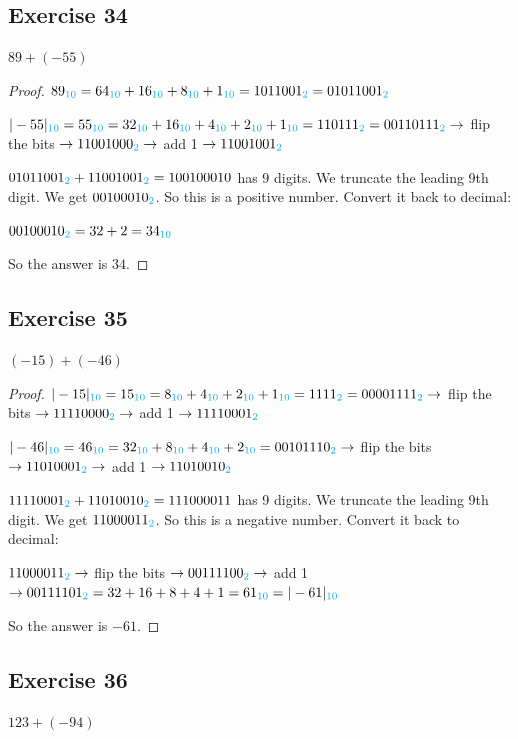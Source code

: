 \documentclass[14pt]{extarticle}
\newcommand{\base}[1]{{\color{cyan}#1}}
\begin{document}
\subsection{Exercise 34}
$89 + (-55)$

\begin{proof}
$89_\base{10} = 64_\base{10} + 16_\base{10} + 8_\base{10} +
1_\base{10} = 1011001_\base{2} = 01011001_\base{2}$

$|-55|_\base{10} = 55_\base{10} = 32_\base{10} + 16_\base{10} + 4_\base{10} + 2_\base{10} + 1_\base{10} = 110111_\base{2} = 00110111_\base{2} \to$ flip the bits $\to 11001000_\base{2} \to$ add 1 $\to 11001001_\base{2}$

$01011001_\base{2} + 11001001_\base{2} = 1 0010 0010$ has 9 digits. We truncate the leading 9th digit. We get $00100010_\base{2}$. So this is a positive number. Convert it back to decimal:

$00100010_\base{2} = 32 + 2 = 34_\base{10}$

So the answer is $34$.
\end{proof}

\subsection{Exercise 35}
$(-15) + (-46)$

\begin{proof}
$|-15|_\base{10} = 15_\base{10} = 8_\base{10} + 4_\base{10} +
2_\base{10} + 1_\base{10} = 1111_\base{2} = 00001111_\base{2} \to$ flip the bits $\to 11110000_\base{2} \to$ add 1 $\to 11110001_\base{2}$

$|-46|_\base{10} = 46_\base{10} = 32_\base{10} + 8_\base{10} + 4_\base{10} + 2_\base{10} = 00101110_\base{2} \to$ flip the bits $\to 11010001_\base{2} \to$ add 1 $\to 11010010_\base{2}$

$11110001_\base{2} + 11010010_\base{2} = 1 1100 0011$ has 9 digits. We truncate the leading 9th digit. We get $11000011_\base{2}$. So this is a negative number. Convert it back to decimal:

$11000011_\base{2} \to$ flip the bits $\to 00111100_\base{2} \to$ add 1 $\to 00111101_\base{2} = 32 + 16 + 8 + 4 + 1 = 61_\base{10} = |-61|_\base{10}$

So the answer is $-61$.
\end{proof}

\subsection{Exercise 36}
$123 + (-94)$
\end{document}
